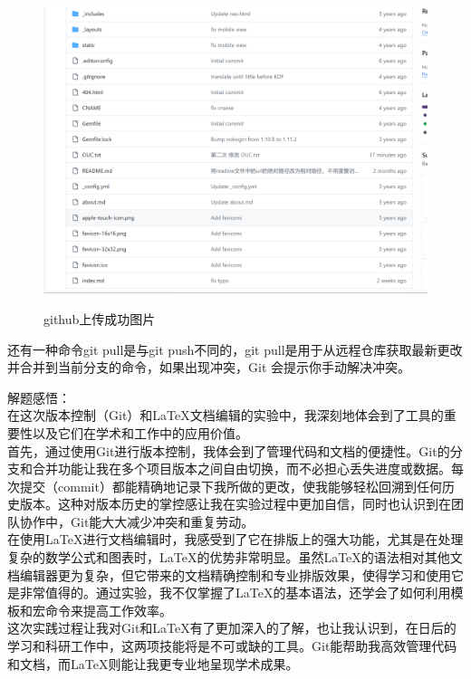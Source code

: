\documentclass[
    report,     %
    oneside,    %
    UTF8,       %
    zihao=-4    %
]{config} %
\begin{document}
\begin{figure}[H] %
    \centering %
    \includegraphics[width=0.9\linewidth]{image14.png}
    \caption*{github上传成功图片} %
    \caption{} %
    \label{fig:example1} %
\end{figure}
\vspace{-0.7em}  %

还有一种命令git pull是与git push不同的，git pull是用于从远程仓库获取最新更改并合并到当前分支的命令，如果出现冲突，Git 会提示你手动解决冲突。

解题感悟：\\
在这次版本控制（Git）和LaTeX文档编辑的实验中，我深刻地体会到了工具的重要性以及它们在学术和工作中的应用价值。\\

首先，通过使用Git进行版本控制，我体会到了管理代码和文档的便捷性。Git的分支和合并功能让我在多个项目版本之间自由切换，而不必担心丢失进度或数据。每次提交（commit）都能精确地记录下我所做的更改，使我能够轻松回溯到任何历史版本。这种对版本历史的掌控感让我在实验过程中更加自信，同时也认识到在团队协作中，Git能大大减少冲突和重复劳动。\\

在使用LaTeX进行文档编辑时，我感受到了它在排版上的强大功能，尤其是在处理复杂的数学公式和图表时，LaTeX的优势非常明显。虽然LaTeX的语法相对其他文档编辑器更为复杂，但它带来的文档精确控制和专业排版效果，使得学习和使用它是非常值得的。通过实验，我不仅掌握了LaTeX的基本语法，还学会了如何利用模板和宏命令来提高工作效率。\\

这次实践过程让我对Git和LaTeX有了更加深入的了解，也让我认识到，在日后的学习和科研工作中，这两项技能将是不可或缺的工具。Git能帮助我高效管理代码和文档，而LaTeX则能让我更专业地呈现学术成果。\\
\end{document}
